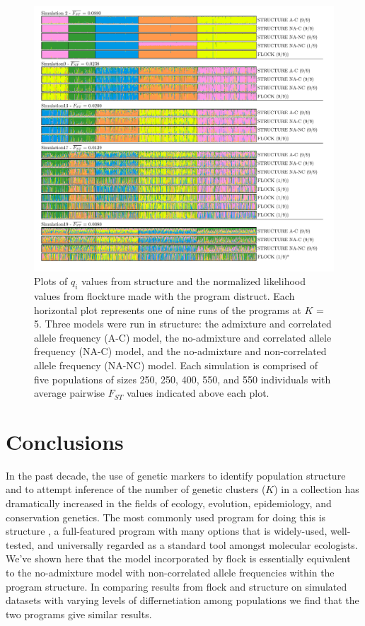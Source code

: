  \begin{figure}
\centering
  \includegraphics[width=.8\linewidth]{images/Figures-Pat/FlockturevStructureDistruct.pdf}
  \caption{Plots of $q_i$ values from {\sc structure} and the normalized likelihood values from
  {\sc flockture} made with the program {\sc distruct}. Each horizontal plot represents one of nine 
 runs of the programs  at $K$ = 5. Three models were run in structure: the admixture and correlated allele 
  frequency (A-C) model, 
the no-admixture and correlated allele frequency (NA-C) model, 
and the no-admixture and non-correlated allele frequency (NA-NC) model. Each simulation is comprised of
 five populations of sizes 250, 250, 400, 550, and 550 individuals with average pairwise $F_{ST}$ values
 indicated above each plot.}
  \label{fig:FvSdistruct}
\end{figure}

 

\section*{Conclusions}
In the past decade, the use of genetic markers to identify population structure and to attempt inference of
the number of genetic clusters ($K$) in a collection has dramatically increased in the fields of ecology, evolution, 
epidemiology, and conservation
genetics. The most commonly used program for doing this is {\sc structure} \citep{Pritchardetal2000,Falushetal2003}, 
a full-featured program with many options that is widely-used, well-tested, and universally regarded as a standard tool amongst molecular ecologists. 
We've shown here that the model incorporated by {\sc flock} is essentially equivalent to the no-admixture model 
with non-correlated allele frequencies within the program {\sc structure}. In comparing results from {\sc flock} and {\sc structure} 
on simulated datasets with varying levels of differnetiation among populations
we find that the two programs give similar results.

